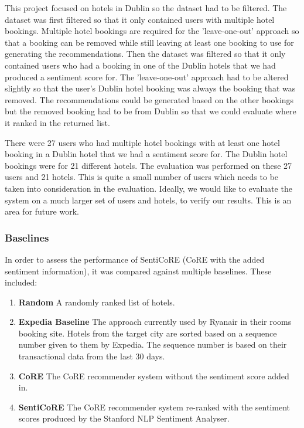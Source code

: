 This project focused on hotels in Dublin so the dataset had to be filtered. The dataset was first filtered so that it only contained users with multiple hotel bookings. Multiple hotel bookings are required for the 'leave-one-out' approach so that a booking can be removed while still leaving at least one booking to use for generating the recommendations. Then the dataset was filtered so that it only contained users who had a booking in one of the Dublin hotels that we had produced a sentiment score for. The 'leave-one-out' approach had to be altered slightly so that the user's Dublin hotel booking was always the booking that was removed. The recommendations could be generated based on the other bookings but the removed booking had to be from Dublin so that we could evaluate where it ranked in the returned list.

There were 27 users who had multiple hotel bookings with at least one hotel booking in a Dublin hotel that we had a sentiment score for. The Dublin hotel bookings were for 21 different hotels. The evaluation was performed on these 27 users and 21 hotels. This is quite a small number of users which needs to be taken into consideration in the evaluation. Ideally, we would like to evaluate the system on a much larger set of users and hotels, to verify our results. This is an area for future work.

\subsubsection{Baselines}

In order to assess the performance of SentiCoRE (CoRE with the added sentiment information), it was compared against multiple baselines. These included: 
\begin{enumerate}
    \item \textbf{Random} \newline
    A randomly ranked list of hotels.
    \item \textbf{Expedia Baseline} \newline
    The approach currently used by Ryanair in their rooms booking site. Hotels from the target city are sorted based on a sequence number given to them by Expedia. The sequence number is based on their transactional data from the last 30 days.
    \item \textbf{CoRE} \newline
    The CoRE recommender system without the sentiment score added in.
    \item \textbf{SentiCoRE} \newline
    The CoRE recommender system re-ranked with the sentiment scores produced by the Stanford NLP Sentiment Analyser.
\end{enumerate}

